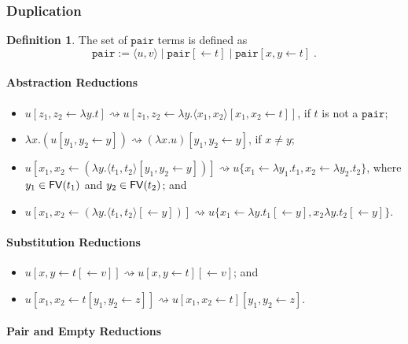 \documentclass[11pt,a4paper]{article}
\theoremstyle{definition}
\newtheorem{definition}{Definition}
\theoremstyle{plain}
\theoremstyle{remark}
\begin{document}
\subsubsection{Duplication}

\newcommand{\tpair}{{\mathtt{pair}}}

\begin{definition}
	The set of $\tpair$ terms is defined as
	\[\tpair:=\langle u,v\rangle\;|\;\tpair[\leftarrow t]\;|\;\tpair[x,y\leftarrow t]\;.\]
\end{definition}

\paragraph{Abstraction Reductions}

\begin{itemize}
	\item $u[z_1,z_2\leftarrow\lambda y.t]\rightsquigarrow u[z_1,z_2\leftarrow\lambda y.\langle x_1,x_2\rangle[x_1,x_2\leftarrow t]]$, if $t$ is not a $\tpair$;
	\item $\lambda x.(u[y_1,y_2\leftarrow y])\rightsquigarrow (\lambda x.u)[y_1,y_2\leftarrow y]$, if $x\neq y$;
	\item $u[x_1,x_2\leftarrow(\lambda y.\langle t_1,t_2\rangle[y_1,y_2\leftarrow y])]\rightsquigarrow u\{x_1\leftarrow\lambda y_1.t_1,x_2\leftarrow\lambda y_2.t_2\}$, where $y_1\in{\mathop{\mathsf{FV}}}(t_1)$ and $y_2\in{\mathop{\mathsf{FV}}}(t_2)$; and
	\item $u[x_1,x_2\leftarrow(\lambda y.\langle t_1,t_2\rangle[\leftarrow y])]\rightsquigarrow u\{x_1\leftarrow\lambda y.t_1[\leftarrow y],x_2\lambda y.t_2[\leftarrow y]\}$.
\end{itemize}

\paragraph{Substitution Reductions}

\begin{itemize}
	\item $u[x,y\leftarrow t[\leftarrow v]]\rightsquigarrow u[x,y\leftarrow t][\leftarrow v]$; and
	\item $u[x_1,x_2\leftarrow t[y_1,y_2\leftarrow z]]\rightsquigarrow u[x_1,x_2\leftarrow t][y_1,y_2\leftarrow z]$.
\end{itemize}

\paragraph{Pair and Empty Reductions}
\end{document}
